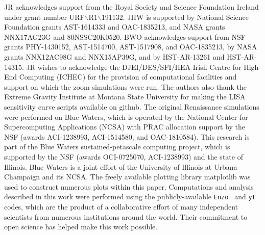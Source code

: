 \documentclass[graphics, twocolumn, usenatbib]{mn2e}
\newcommand{\enzo}{\texttt{Enzo~}}
\newcommand{\yt}{\texttt{yt~}}
\begin{document}
\noindent JR acknowledges support from the Royal Society and Science Foundation Ireland under
grant number URF$\backslash$R1$\backslash$191132.
JHW is supported by National Science Foundation grants AST-1614333 and
OAC-1835213, and NASA grants NNX17AG23G and 80NSSC20K0520.  
BWO acknowledges support from NSF grants PHY-1430152, AST-1514700, AST-1517908, and  OAC-1835213, by NASA grants NNX12AC98G and NNX15AP39G, and by HST-AR-13261 and HST-AR-14315.
JR wishes to acknowledge the DJEI/DES/SFI/HEA Irish Centre for High-End Computing (ICHEC) for the
provision of computational facilities and support on which the zoom simulations were run.
The authors also thank the Extreme Gravity Institute at Montana State University for making the
LISA sensitivity curve scripts available on github. 
The original Renaissance simulations were performed on Blue 
Waters, which is operated by the National Center for Supercomputing Applications (NCSA)
with PRAC allocation support by the NSF (awards ACI-1238993, ACI-1514580, and OAC-1810584).
This research is part of the Blue Waters sustained-petascale computing project, which
is supported by the NSF (awards OCI-0725070, ACI-1238993) and the state of
Illinois. Blue Waters is a joint effort of the University of Illinois at
Urbana-Champaign and its NCSA.  The freely available plotting library {\sc
matplotlib} \citep{matplotlib} was used to construct numerous plots within this
paper. Computations and analysis described in this work were performed using the
publicly-available \enzo{}\citep{Enzo_2014, Enzo_2019} and \yt{} \citep{YT} codes,
which are the product of a collaborative effort of many independent scientists
from numerous institutions around the world. Their commitment to open science
has helped make this work possible.


\label{lastpage}


\end{document}
